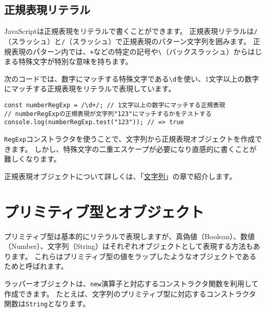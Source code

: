 \hypertarget{regexp-literal}{%
\subsection{正規表現リテラル}\label{regexp-literal}}

JavaScriptは正規表現をリテラルで書くことができます。
正規表現リテラルは\texttt{/}（スラッシュ）と\texttt{/}（スラッシュ）で正規表現のパターン文字列を囲みます。
正規表現のパターン内では、\texttt{+}などの特定の記号や\texttt{\textbackslash}（バックスラッシュ）からはじまる特殊文字が特別な意味を持ちます。

次のコードでは、数字にマッチする特殊文字である\texttt{\textbackslash d}を使い、1文字以上の数字にマッチする正規表現をリテラルで表現しています。

\begin{lstlisting}
const numberRegExp = /\d+/; // 1文字以上の数字にマッチする正規表現
// numberRegExpの正規表現が文字列"123"にマッチするかをテストする
console.log(numberRegExp.test("123")); // => true
\end{lstlisting}

\texttt{RegExp}コンストラクタを使うことで、文字列から正規表現オブジェクトを作成できます。
しかし、特殊文字の二重エスケープが必要になり直感的に書くことが難しくなります。

正規表現オブジェクトについて詳しくは、「\hyperlink{string}{文字列}」の章で紹介します。

\hypertarget{primitive-and-wrapper-object}{%
\section{プリミティブ型とオブジェクト}\label{primitive-and-wrapper-object}}

プリミティブ型は基本的にリテラルで表現しますが、真偽値（Boolean）、数値（Number）、文字列（String）はそれぞれオブジェクトとして表現する方法もあります。
これらはプリミティブ型の値をラップしたようなオブジェクトであるため\textbf{}と呼ばれます。

ラッパーオブジェクトは、\texttt{new}演算子と対応するコンストラクタ関数を利用して作成できます。
たとえば、文字列のプリミティブ型に対応するコンストラクタ関数は\texttt{String}となります。

